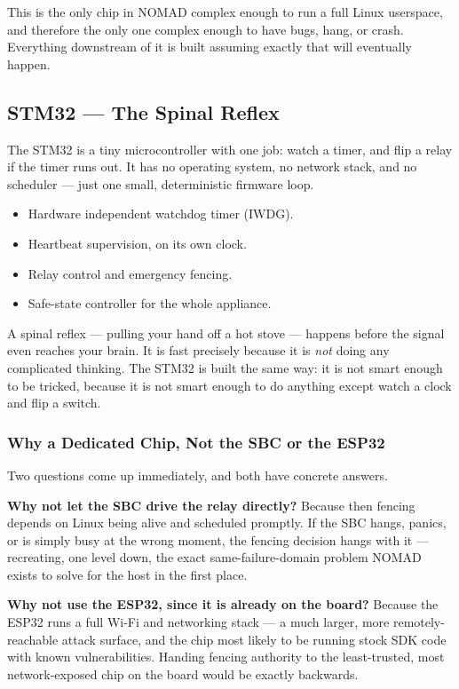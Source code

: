 \documentclass[11pt,a4paper]{article}
\begin{document}
This is the only chip in NOMAD complex enough to run a full Linux
userspace, and therefore the only one complex enough to have bugs, hang,
or crash. Everything downstream of it is built assuming exactly that
will eventually happen.

\subsection{STM32 --- The Spinal Reflex}
\label{sec:stm32}

The STM32 is a tiny microcontroller with one job: watch a timer, and
flip a relay if the timer runs out. It has no operating system, no
network stack, and no scheduler --- just one small, deterministic
firmware loop.

\begin{itemize}
  \item Hardware independent watchdog timer (IWDG).
  \item Heartbeat supervision, on its own clock.
  \item Relay control and emergency fencing.
  \item Safe-state controller for the whole appliance.
\end{itemize}

\begin{analogybox}
A spinal reflex --- pulling your hand off a hot stove --- happens before
the signal even reaches your brain. It is fast precisely because it is
\emph{not} doing any complicated thinking. The STM32 is built the same
way: it is not smart enough to be tricked, because it is not smart
enough to do anything except watch a clock and flip a switch.
\end{analogybox}

\subsubsection{Why a Dedicated Chip, Not the SBC or the ESP32}

Two questions come up immediately, and both have concrete answers.

\textbf{Why not let the SBC drive the relay directly?} Because then
fencing depends on Linux being alive and scheduled promptly. If the SBC
hangs, panics, or is simply busy at the wrong moment, the fencing
decision hangs with it --- recreating, one level down, the exact
same-failure-domain problem NOMAD exists to solve for the host in the
first place.

\textbf{Why not use the ESP32, since it is already on the board?}
Because the ESP32 runs a full Wi-Fi and networking stack --- a much
larger, more remotely-reachable attack surface, and the chip most
likely to be running stock SDK code with known vulnerabilities. Handing
fencing authority to the least-trusted, most network-exposed chip on
the board would be exactly backwards.
\end{document}

